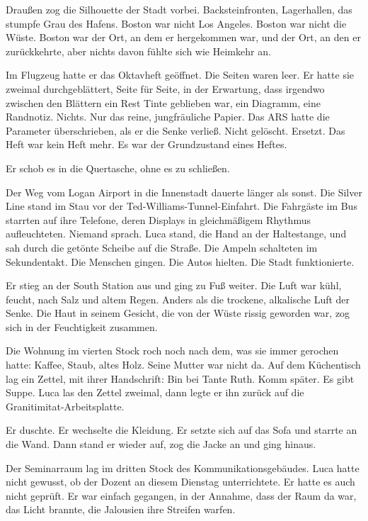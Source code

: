 \documentclass[
  ngerman,
]{article}
\begin{document}
Draußen zog die Silhouette der Stadt vorbei. Backsteinfronten,
Lagerhallen, das stumpfe Grau des Hafens. Boston war nicht Los Angeles.
Boston war nicht die Wüste. Boston war der Ort, an dem er hergekommen
war, und der Ort, an den er zurückkehrte, aber nichts davon fühlte sich
wie Heimkehr an.

Im Flugzeug hatte er das Oktavheft geöffnet. Die Seiten waren leer. Er
hatte sie zweimal durchgeblättert, Seite für Seite, in der Erwartung,
dass irgendwo zwischen den Blättern ein Rest Tinte geblieben war, ein
Diagramm, eine Randnotiz. Nichts. Nur das reine, jungfräuliche Papier.
Das ARS hatte die Parameter überschrieben, als er die Senke verließ.
Nicht gelöscht. Ersetzt. Das Heft war kein Heft mehr. Es war der
Grundzustand eines Heftes.

Er schob es in die Quertasche, ohne es zu schließen.

Der Weg vom Logan Airport in die Innenstadt dauerte länger als sonst.
Die Silver Line stand im Stau vor der Ted-Williams-Tunnel-Einfahrt. Die
Fahrgäste im Bus starrten auf ihre Telefone, deren Displays in
gleichmäßigem Rhythmus aufleuchteten. Niemand sprach. Luca stand, die
Hand an der Haltestange, und sah durch die getönte Scheibe auf die
Straße. Die Ampeln schalteten im Sekundentakt. Die Menschen gingen. Die
Autos hielten. Die Stadt funktionierte.

Er stieg an der South Station aus und ging zu Fuß weiter. Die Luft war
kühl, feucht, nach Salz und altem Regen. Anders als die trockene,
alkalische Luft der Senke. Die Haut in seinem Gesicht, die von der Wüste
rissig geworden war, zog sich in der Feuchtigkeit zusammen.

Die Wohnung im vierten Stock roch noch nach dem, was sie immer gerochen
hatte: Kaffee, Staub, altes Holz. Seine Mutter war nicht da. Auf dem
Küchentisch lag ein Zettel, mit ihrer Handschrift: Bin bei Tante Ruth.
Komm später. Es gibt Suppe. Luca las den Zettel zweimal, dann legte er
ihn zurück auf die Granitimitat-Arbeitsplatte.

Er duschte. Er wechselte die Kleidung. Er setzte sich auf das Sofa und
starrte an die Wand. Dann stand er wieder auf, zog die Jacke an und ging
hinaus.

Der Seminarraum lag im dritten Stock des Kommunikationsgebäudes. Luca
hatte nicht gewusst, ob der Dozent an diesem Dienstag unterrichtete. Er
hatte es auch nicht geprüft. Er war einfach gegangen, in der Annahme,
dass der Raum da war, das Licht brannte, die Jalousien ihre Streifen
warfen.
\end{document}
